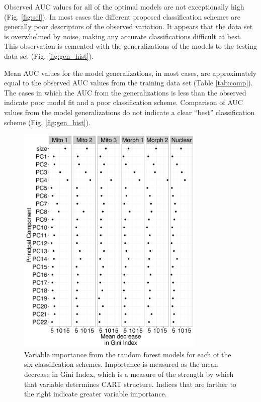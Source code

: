 \documentclass[12pt,letterpaper]{article}
\begin{document}
Observed AUC values for all of the optimal models are not exceptionally high (Fig. \ref{fig:sel}). In most cases the different proposed classification schemes are generally poor descriptors of the observed variation. It appears that the data set is overwhelmed by noise, making any accurate classifications difficult at best. This observation is cemented with the generalizations of the models to the testing data set (Fig. \ref{fig:gen_hist}).

Mean AUC values for the model generalizations, in most cases, are approximately equal to the observed AUC values from the training data set (Table \ref{tab:comp}). The  cases in which the AUC from the  generalizations is less than the observed indicate poor model fit and a poor classification scheme. Comparison of AUC values from the model generalizations do not indicate a clear ``best'' classification scheme (Fig. \ref{fig:gen_hist}). 

\begin{figure}[h]
  \centering
  \includegraphics[height = 0.8\textheight, width = 0.8\textwidth, keepaspectratio = true]{figure/var_imp}
  \caption{Variable importance from the random forest models for each of the six classification schemes. Importance is measured as the mean decrease in Gini Index, which is a measure of the strength by which that variable determines CART structure. Indices that are farther to the right indicate greater variable importance.}
  \label{fig:var_imp}
\end{figure}
\end{document}
